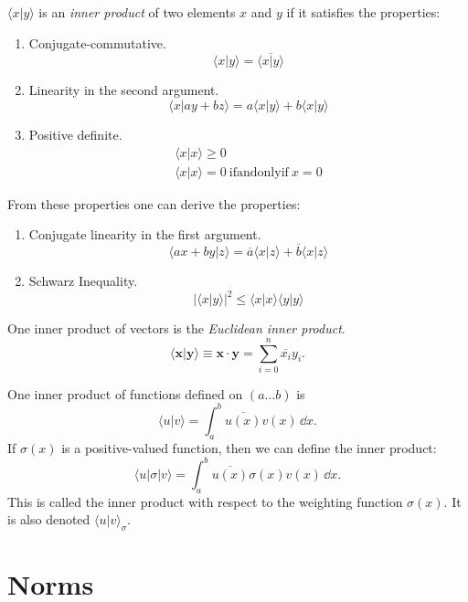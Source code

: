 $\langle x | y \rangle$ is an \textit{inner product} of two elements $x$ and $y$ if it 
satisfies the properties:
\begin{enumerate}
\item
  Conjugate-commutative.
  \[
  \langle x | y \rangle = \overline{ \langle x | y \rangle }
  \]
\item
  Linearity in the second argument.
  \[
  \langle x | a y + b z \rangle = a \langle x | y \rangle + b \langle x | y \rangle
  \]
\item
  Positive definite.
  \begin{gather*}
    \langle x | x \rangle \geq 0 \\
    \langle x | x \rangle = 0\ \mathrm{if and only if}\ x = 0
  \end{gather*}
\end{enumerate}

From these properties one can derive the properties:
\begin{enumerate}
\item
  Conjugate linearity in the first argument.
  \[
  \langle a x + b y | z \rangle = \overline{a} \langle x | z \rangle + \overline{b} \langle x | z \rangle
  \]
\item
  Schwarz Inequality.
  \[
  \left| \langle x | y \rangle \right|^2 \leq \langle x | x \rangle \langle y | y \rangle
  \]
\end{enumerate}





One inner product of vectors is the \textit{Euclidean inner product}.
\[
\langle \mathbf{x} | \mathbf{y} \rangle \equiv \mathbf{x} \cdot \mathbf{y} = \sum_{i=0}^n \overline{x_i} y_i.
\]

One inner product of functions defined on $(a \ldots b)$ is
\[
\langle u | v \rangle = \int_a^b \overline{u(x)} v(x) \,\dd x.
\]
If $\sigma(x)$ is a positive-valued function, then we can define the
inner product:
\[
\langle u | \sigma| v \rangle = \int_a^b \overline{u(x)} \sigma(x) v(x) \,\dd x.
\]
This is called the inner product with respect to the weighting function 
$\sigma(x)$.  It is also denoted $\langle u | v \rangle_\sigma$.




\section{Norms}


